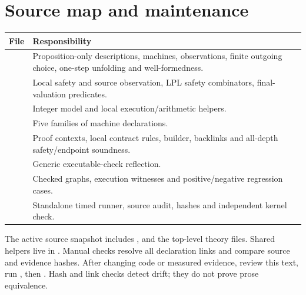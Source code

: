 \section{Source map and maintenance}\label{sec:source-map}
\begin{longtable}{@{}L{0.31\textwidth}L{0.63\textwidth}@{}}
\toprule File & Responsibility\\\midrule
{} & Proposition-only descriptions, machines, observations,
finite outgoing choice, one-step unfolding and well-formedness.\\
 & Local safety and source observation, LPL safety
combinators, final-valuation predicates.\\
 & Integer model and local execution/arithmetic helpers.\\
 & Five families of machine declarations.\\
 & Proof contexts, local contract rules, builder,
backlinks and all-depth safety/endpoint soundness.\\
 & Generic executable-check reflection.\\
 & Checked graphs, execution witnesses and
positive/negative regression cases.\\
 & Standalone timed runner, source audit,
hashes and independent kernel check.\\
\bottomrule
\end{longtable}

The active source snapshot includes , 
and the top-level theory files. Shared helpers live in . Manual checks
resolve all declaration links and compare source and evidence hashes.
After changing code or measured evidence, review this text, run
, then .
Hash and link checks detect drift; they do not prove prose equivalence.
